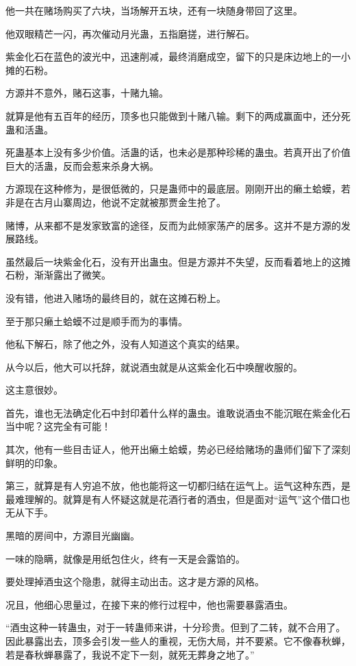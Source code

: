 \begin{this_body}
他一共在赌场购买了六块，当场解开五块，还有一块随身带回了这里。

他双眼精芒一闪，再次催动月光蛊，五指磨搓，进行解石。

紫金化石在蓝色的波光中，迅速削减，最终消磨成空，留下的只是床边地上的一小摊的石粉。

方源并不意外，赌石这事，十赌九输。

就算是他有五百年的经历，顶多也只能做到十赌八输。剩下的两成赢面中，还分死蛊和活蛊。

死蛊基本上没有多少价值。活蛊的话，也未必是那种珍稀的蛊虫。若真开出了价值巨大的活蛊，反而会惹来杀身大祸。

方源现在这种修为，是很低微的，只是蛊师中的最底层。刚刚开出的癞土蛤蟆，若非是在古月山寨周边，他说不定就被那贾金生抢了。

赌博，从来都不是发家致富的途径，反而为此倾家荡产的居多。这并不是方源的发展路线。

虽然最后一块紫金化石，没有开出蛊虫。但是方源并不失望，反而看着地上的这摊石粉，渐渐露出了微笑。

没有错，他进入赌场的最终目的，就在这摊石粉上。

至于那只癞土蛤蟆不过是顺手而为的事情。

他私下解石，除了他之外，没有人知道这个真实的结果。

从今以后，他大可以托辞，就说酒虫就是从这紫金化石中唤醒收服的。

这主意很妙。

首先，谁也无法确定化石中封印着什么样的蛊虫。谁敢说酒虫不能沉眠在紫金化石当中呢？这完全有可能！

其次，他有一些目击证人，他开出癞土蛤蟆，势必已经给赌场的蛊师们留下了深刻鲜明的印象。

第三，就算是有人穷追不放，他也能将这一切都归结在运气上。运气这种东西，是最难理解的。就算是有人怀疑这就是花酒行者的酒虫，但是面对“运气”这个借口也无从下手。

黑暗的房间中，方源目光幽幽。

一味的隐瞒，就像是用纸包住火，终有一天是会露馅的。

要处理掉酒虫这个隐患，就得主动出击。这才是方源的风格。

况且，他细心思量过，在接下来的修行过程中，他也需要暴露酒虫。

“酒虫这种一转蛊虫，对于一转蛊师来讲，十分珍贵。但到了二转，就不合用了。因此暴露出去，顶多会引发一些人的重视，无伤大局，并不要紧。它不像春秋蝉，若是春秋蝉暴露了，我说不定下一刻，就死无葬身之地了。”


\end{this_body}

